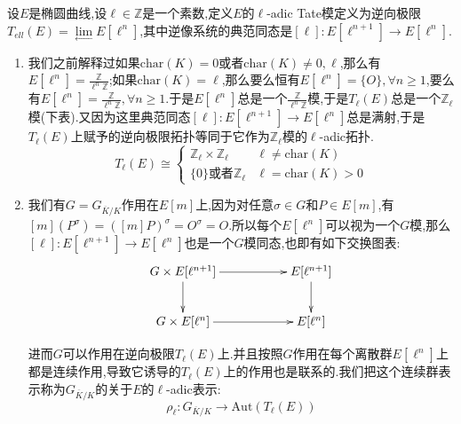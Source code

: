 设$E$是椭圆曲线,设$\ell\in\mathbb{Z}$是一个素数,定义$E$的$\ell$-adic Tate模定义为逆向极限$T_{ell}(E)=\lim\limits_{\leftarrow}E[\ell^n]$,其中逆像系统的典范同态是$[\ell]:E[\ell^{n+1}]\to E[\ell^n]$.
\begin{enumerate}
	\item 我们之前解释过如果$\mathrm{char}(K)=0$或者$\mathrm{char}(K)\not=0,\ell$,那么有$E[\ell^n]=\frac{\mathbb{Z}}{\ell^n\mathbb{Z}}$;如果$\mathrm{char}(K)=\ell$,那么要么恒有$E[\ell^n]=\{O\},\forall n\ge1$,要么有$E[\ell^n]=\frac{\mathbb{Z}}{\ell^n\mathbb{Z}},\forall n\ge1$.于是$E[\ell^n]$总是一个$\frac{\mathbb{Z}}{\ell^n\mathbb{Z}}$模,于是$T_{\ell}(E)$总是一个$\mathbb{Z}_{\ell}$模(下表).又因为这里典范同态$[\ell]:E[\ell^{n+1}]\to E[\ell^n]$总是满射,于是$T_{\ell}(E)$上赋予的逆向极限拓扑等同于它作为$\mathbb{Z}_{\ell}$模的$\ell$-adic拓扑.
	$$T_{\ell}(E)\cong\left\{\begin{array}{cc}\mathbb{Z}_{\ell}\times\mathbb{Z}_{\ell}&\ell\not=\mathrm{char}(K)\\\{0\}\text{或者}\mathbb{Z}_{\ell}&\ell=\mathrm{char}(K)>0\end{array}\right.$$
	\item 我们有$G=G_{\overline{K}/K}$作用在$E[m]$上,因为对任意$\sigma\in G$和$P\in E[m]$,有$[m](P^{\sigma})=([m]P)^{\sigma}=O^{\sigma}=O$.所以每个$E[\ell^n]$可以视为一个$G$模,那么$[\ell]:E[\ell^{n+1}]\to E[\ell^n]$也是一个$G$模同态,也即有如下交换图表:
	$$\xymatrix{G\times E[\ell^{n+1}]\ar[rr]\ar[d]&&E[\ell^{n+1}]\ar[d]\\G\times E[\ell^n]\ar[rr]&&E[\ell^n]}$$
	
	进而$G$可以作用在逆向极限$T_{\ell}(E)$上.并且按照$G$作用在每个离散群$E[\ell^n]$上都是连续作用,导致它诱导的$T_{\ell}(E)$上的作用也是联系的.我们把这个连续群表示称为$G_{\overline{K}/K}$的关于$E$的$\ell$-adic表示:
	$$\rho_{\ell}:G_{\overline{K}/K}\to\mathrm{Aut}(T_{\ell}(E))$$
	

\end{enumerate}
